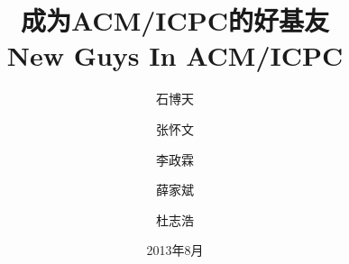 \documentclass{ctexbook}
\title{成为ACM/ICPC的好基友\\New Guys In ACM/ICPC}
\author{石博天 \and 张怀文 \and 李政霖 \and 薛家斌 \and 杜志浩 }
\date{2013年8月}
\begin{document}
\maketitle
\tableifcontents


\end{document}
